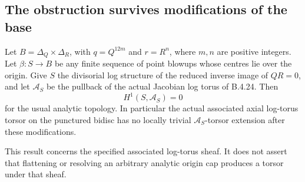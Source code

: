 \subsection{The obstruction survives modifications of the base}

\begin{proposition}
\label{push:B427}
Let $B=\Delta_Q\times\Delta_R$, with
$q=Q^{12m}$ and $r=R^n$, where $m,n$ are positive
integers. Let $\beta:S\to B$ be any finite sequence
of point blowups whose centres lie over the origin.
Give $S$ the divisorial log structure of the reduced
inverse image of $QR=0$, and let $\mathcal A_S$ be
the pullback of the actual Jacobian log torus of
B.4.24. Then
\[
 H^1(S,\mathcal A_S)=0
 \tag{B.4.27.1}
\]
for the usual analytic topology. In particular the
actual associated axial log-torus torsor on the
punctured bidisc has no locally trivial
$\mathcal A_S$-torsor extension after these
modifications.

This result concerns the specified associated
log-torus sheaf. It does not assert that flattening
or resolving an arbitrary analytic origin cap
produces a torsor under that sheaf.
\end{proposition}

